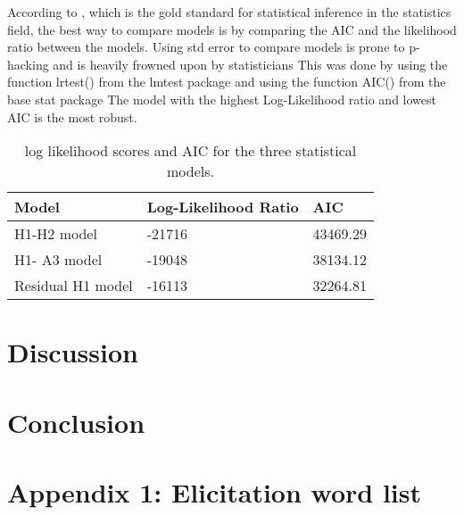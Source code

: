 \documentclass[12pt, letterpaper]{article}
\providecommand{\lsptoprule}{\midrule\toprule}
\providecommand{\lspbottomrule}{\bottomrule\midrule}
\begin{document}
According to \citet{casellaStatisticalInference2002}, which is the gold standard for statistical inference in the statistics field, the best way to compare models is by comparing the AIC and the likelihood ratio between the models.
Using std error to compare models is prone to p-hacking and is heavily frowned upon by statisticians 
This was done by using the function lrtest() from the lmtest package and using the function AIC() from the base stat package
The model with the highest Log-Likelihood ratio and lowest AIC is the most robust. 

\begin{table}[!h]
  \centering
  \caption{log likelihood scores and AIC for the three statistical models.}
  \label{tab:Comparison}
  \begin{tabular}{lll}
    \lsptoprule
    Model & Log-Likelihood Ratio & AIC \\
    \hline
    H1-H2 model & -21716 & 43469.29 \\
    H1- A3 model & -19048 & 38134.12 \\
    Residual H1 model & -16113 & 32264.81 \\
    \lspbottomrule
  \end{tabular}
\end{table}

\section{Discussion} \label{sec:Discussion}



\section{Conclusion} \label{sec:Conclusions}



\printbibliography[heading=bibintoc]

\section*{Appendix 1: Elicitation word list}
\end{document}
